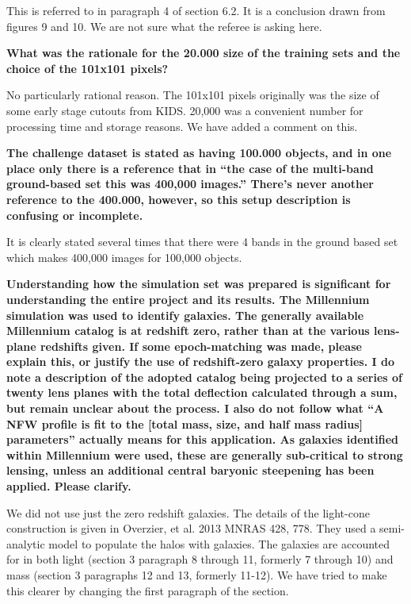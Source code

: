 \documentclass[11pt,a4paper]{article}
\begin{document}
This is referred to in paragraph 4 of section 6.2.  It is a conclusion drawn from figures 9 and 10.  We are not sure what the referee is asking here.

{\bf
What was the rationale for the 20.000 size of the training sets and the choice of the 101x101 pixels? 
}

No particularly rational reason.  The 101x101 pixels originally was the size of some early stage cutouts from KIDS.  20,000 was a convenient number for processing time and storage reasons.  We have added a comment on this.

{\bf
The challenge dataset is stated as having 100.000 objects, and in one place only there is a reference that in “the case of the multi-band ground-based set this was 400,000 images.”  There’s never another reference to the 400.000, however, so this setup description is confusing or incomplete. 
}

It is clearly stated several times that there were 4 bands in the ground based set which makes 400,000 images for 100,000 objects.

{\bf
Understanding how the simulation set was prepared is significant for understanding the entire project and its results.  The Millennium simulation was used to identify galaxies.  The generally available Millennium catalog is at redshift zero, rather than at the various lens-plane redshifts given.  If some epoch-matching was made, please explain this, or justify the use of redshift-zero galaxy properties.  I do note a description of the adopted catalog being projected to a series of twenty lens planes with the total deflection calculated through a sum, but remain unclear about the process.  I also do not follow what “A NFW profile is fit to the [total mass, size, and half mass radius] parameters” actually means for this application.  As galaxies identified within Millennium were used, these are generally sub-critical to strong lensing, unless an additional central baryonic steepening has been applied. Please clarify.  
}

We did not use just the zero redshift galaxies.  The details of the light-cone construction is given in Overzier, et al. 2013 MNRAS 428, 778.  They used a semi-analytic model to populate the halos with galaxies.  The galaxies are accounted for in both light (section 3 paragraph 8 through 11, formerly 7 through 10) and mass 
(section 3 paragraphs 12 and 13, formerly 11-12).  We have tried to make this clearer  by changing the first paragraph of the section.
\end{document}
